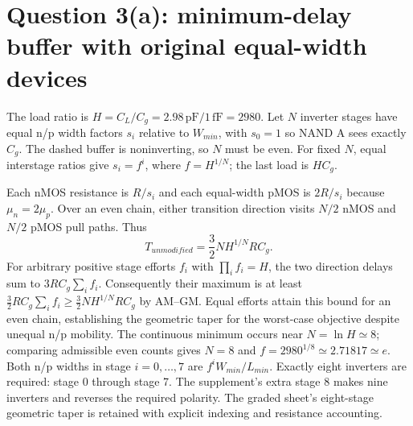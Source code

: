 \documentclass[10pt]{article}
\newcommand{\gnd}[2]{\draw(#1,#2)--(#1,{#2-.12});\draw({#1-.17},{#2-.12})--({#1+.17},{#2-.12});\draw({#1-.11},{#2-.2})--({#1+.11},{#2-.2});}
\begin{document}
\newpage\section*{Question 3(a): minimum-delay buffer with original equal-width devices}
The load ratio is $H=C_L/C_g=2.98\,\mathrm{pF}/1\,\mathrm{fF}=2980$. Let $N$ inverter stages have equal n/p width factors $s_i$ relative to $W_{min}$, with $s_0=1$ so NAND A sees exactly $C_g$. The dashed buffer is noninverting, so $N$ must be even. For fixed $N$, equal interstage ratios give $s_i=f^i$, where $f=H^{1/N}$; the last load is $H C_g$.
\begin{center}\end{center}
Each nMOS resistance is $R/s_i$ and each equal-width pMOS is $2R/s_i$ because $\mu_n=2\mu_p$. Over an even chain, either transition direction visits $N/2$ nMOS and $N/2$ pMOS pull paths. Thus
\[T_{unmodified}=\frac32N H^{1/N}RC_g.\]
For arbitrary positive stage efforts $f_i$ with $\prod_i f_i=H$, the two direction delays sum to $3RC_g\sum_i f_i$. Consequently their maximum is at least $\frac32RC_g\sum_i f_i\ge\frac32NH^{1/N}RC_g$ by AM--GM. Equal efforts attain this bound for an even chain, establishing the geometric taper for the worst-case objective despite unequal n/p mobility.
The continuous minimum occurs near $N=\ln H\simeq8$; comparing admissible even counts gives $\boxed{N=8}$ and $f=2980^{1/8}\simeq2.71817\simeq e$. Both n/p widths in stage $i=0,\ldots,7$ are $f^iW_{min}/L_{min}$. Exactly eight inverters are required: stage 0 through stage 7. The supplement's extra stage 8 makes nine inverters and reverses the required polarity. The graded sheet's eight-stage geometric taper is retained with explicit indexing and resistance accounting.
\end{document}
